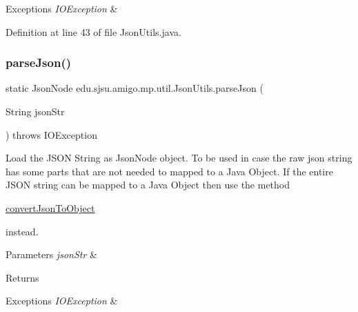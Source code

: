 \begin{DoxyExceptions}{Exceptions}
{\em I\+O\+Exception} & \\
\hline
\end{DoxyExceptions}


Definition at line 43 of file Json\+Utils.\+java.

\mbox{\label{classedu_1_1sjsu_1_1amigo_1_1mp_1_1util_1_1_json_utils_ad8033daeed68ff47f3c6aa0603dad6e2}} 
\subsubsection{\texorpdfstring{parse\+Json()}{parseJson()}}
{\footnotesize\ttfamily static Json\+Node edu.\+sjsu.\+amigo.\+mp.\+util.\+Json\+Utils.\+parse\+Json (\begin{DoxyParamCaption}\item[{String}]{json\+Str }\end{DoxyParamCaption}) throws I\+O\+Exception\hspace{0.3cm}{\ttfamily [static]}}

Load the J\+S\+ON String as Json\+Node object. To be used in case the raw json string has some parts that are not needed to mapped to a Java Object. If the entire J\+S\+ON string can be mapped to a Java Object then use the method
\begin{DoxyCode}
\hyperlink{classedu_1_1sjsu_1_1amigo_1_1mp_1_1util_1_1_json_utils_a5c05bfeb59e28dd21858215642d7ddff}{convertJsonToObject} 
\end{DoxyCode}
 instead.


\begin{DoxyParams}{Parameters}
{\em json\+Str} & \\
\hline
\end{DoxyParams}
\begin{DoxyReturn}{Returns}

\end{DoxyReturn}

\begin{DoxyExceptions}{Exceptions}
{\em I\+O\+Exception} & \\
\hline
\end{DoxyExceptions}


